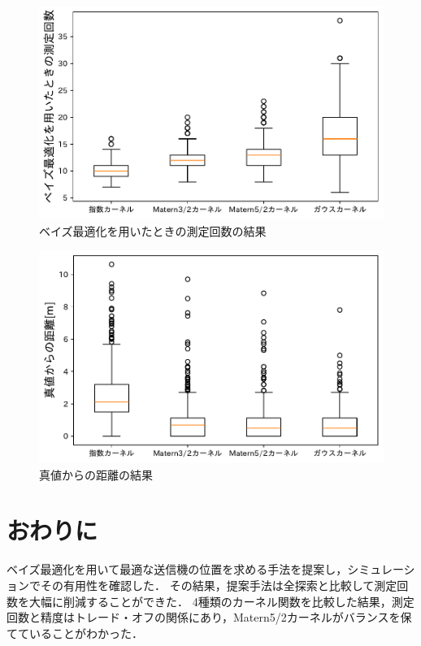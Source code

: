 \documentclass[twocolumn]{ltjarticle}
\begin{document}
\setlength\intextsep{3pt}
\setlength\textfloatsep{3pt}
\begin{figure}[H]
	\centering
	\includegraphics[width=0.83\linewidth]{./figures/count_box.pdf}
	\vspace*{-0.4cm}
	\caption{ベイズ最適化を用いたときの測定回数の結果} \label{fig:result_count}
\end{figure}
\vspace*{-0.1cm}
\begin{figure}[H]
	\centering
	\includegraphics[width=0.83\linewidth]{./figures/dis_box.pdf}
	\vspace*{-0.4cm}
	\caption{真値からの距離の結果} \label{fig:result_error}
\end{figure}

\section{おわりに}

ベイズ最適化を用いて最適な送信機の位置を求める手法を提案し，シミュレーションでその有用性を確認した．
その結果，提案手法は全探索と比較して測定回数を大幅に削減することができた．
4種類のカーネル関数を比較した結果，測定回数と精度はトレード・オフの関係にあり，Matern5/2カーネルがバランスを保てていることがわかった．
\printbibliography[title=参考文献]
\end{document}
